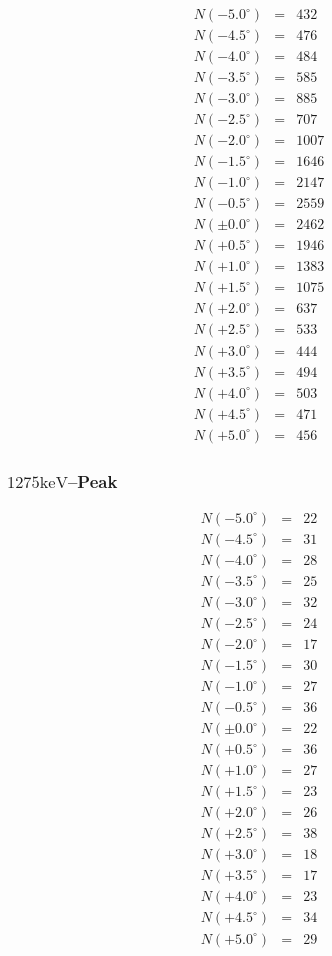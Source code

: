\documentclass[12pt,a4paper]{scrartcl}
\numberwithin{equation}{section} %
\newcommand{\pu}[1]{\ensuremath{\mathrm{#1}}}
\begin{document}
\begin{eqnarray*}
	N(-5.0^\circ) &=& 432 \\
	N(-4.5^\circ) &=& 476 \\
	N(-4.0^\circ) &=& 484 \\
	N(-3.5^\circ) &=& 585 \\
	N(-3.0^\circ) &=& 885 \\
	N(-2.5^\circ) &=& 707 \\
	N(-2.0^\circ) &=& 1007 \\
	N(-1.5^\circ) &=& 1646 \\
	N(-1.0^\circ) &=& 2147 \\
	N(-0.5^\circ) &=& 2559 \\
	N(\pm0.0^\circ) &=& 2462 \\
	N(+0.5^\circ) &=& 1946 \\
	N(+1.0^\circ) &=& 1383 \\
	N(+1.5^\circ) &=& 1075 \\
	N(+2.0^\circ) &=& 637 \\
	N(+2.5^\circ) &=& 533 \\
	N(+3.0^\circ) &=& 444 \\
	N(+3.5^\circ) &=& 494 \\
	N(+4.0^\circ) &=& 503 \\
	N(+4.5^\circ) &=& 471 \\
	N(+5.0^\circ) &=& 456
\end{eqnarray*}

\hypertarget{pu1275kevpeak}{%
	\subsubsection{\texorpdfstring{$\pu{1275keV}$--Peak}{\textbackslash pu\{1275keV\}--Peak}}\label{pu1275kevpeak}}

\begin{eqnarray*}
	N(-5.0^\circ) &=& 22 \\
	N(-4.5^\circ) &=& 31 \\
	N(-4.0^\circ) &=& 28 \\
	N(-3.5^\circ) &=& 25 \\
	N(-3.0^\circ) &=& 32 \\
	N(-2.5^\circ) &=& 24 \\
	N(-2.0^\circ) &=& 17 \\
	N(-1.5^\circ) &=& 30 \\
	N(-1.0^\circ) &=& 27 \\
	N(-0.5^\circ) &=& 36 \\
	N(\pm0.0^\circ) &=& 22 \\
	N(+0.5^\circ) &=& 36 \\
	N(+1.0^\circ) &=& 27 \\
	N(+1.5^\circ) &=& 23 \\
	N(+2.0^\circ) &=& 26 \\
	N(+2.5^\circ) &=& 38 \\
	N(+3.0^\circ) &=& 18 \\
	N(+3.5^\circ) &=& 17 \\
	N(+4.0^\circ) &=& 23 \\
	N(+4.5^\circ) &=& 34 \\
	N(+5.0^\circ) &=& 29
\end{eqnarray*}
\end{document}
